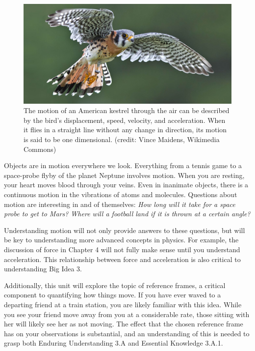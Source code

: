 \documentclass[
]{book}
\begin{document}
\begin{figure}
\hypertarget{import-auto-id2758213}{%
\centering
\includegraphics{images/Figure_02_00_01_D.jpg}
\caption{The motion of an American kestrel through the air can be described by
the bird's displacement, speed, velocity, and acceleration. When it
flies in a straight line without any change in direction, its motion is
said to be one dimensional. (credit: Vince Maidens, Wikimedia
Commons)}\label{import-auto-id2758213}
}
\end{figure}

Objects are in motion everywhere we look. Everything from a tennis game
to a space-probe flyby of the planet Neptune involves motion. When you
are resting, your heart moves blood through your veins. Even in
inanimate objects, there is a continuous motion in the vibrations of
atoms and molecules. Questions about motion are interesting in and of
themselves: \emph{How long will it take for a space probe to get to Mars?
Where will a football land if it is thrown at a certain angle?}

Understanding motion will not only provide answers to these questions,
but will be key to understanding more advanced concepts in physics. For
example, the discussion of force in Chapter 4 will not fully make sense
until you understand acceleration. This relationship between force and
acceleration is also critical to understanding Big Idea 3.

Additionally, this unit will explore the topic of reference frames, a
critical component to quantifying how things move. If you have ever
waved to a departing friend at a train station, you are likely familiar
with this idea. While you see your friend move away from you at a
considerable rate, those sitting with her will likely see her as not
moving. The effect that the chosen reference frame has on your
observations is substantial, and an understanding of this is needed to
grasp both Enduring Understanding 3.A and Essential Knowledge 3.A.1.
\end{document}
